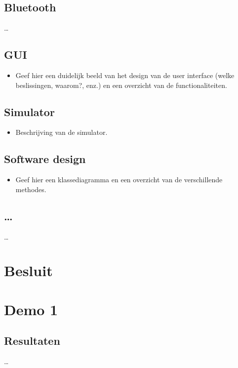 \documentclass[eind]{penoverslag}
\begin{document}
\subsection{Bluetooth}
\ldots

\subsection{GUI}
\begin{itemize}
\item Geef hier een duidelijk beeld van het design van de user interface (welke beslissingen, waarom?, enz.) en een overzicht van de functionaliteiten.
\end{itemize}

\subsection{Simulator}
\begin{itemize}
\item Beschrijving van de simulator.
\end{itemize}

\subsection{Software design}
\begin{itemize}
\item Geef hier een klassediagramma en een overzicht van de verschillende methodes.
\end{itemize}

\subsection{\ldots}
\ldots


\section{Besluit}
\lipsum[6-7]



\newpage
\makeappendix

\section{Demo 1}

\subsection{Resultaten}
\ldots
\end{document}
